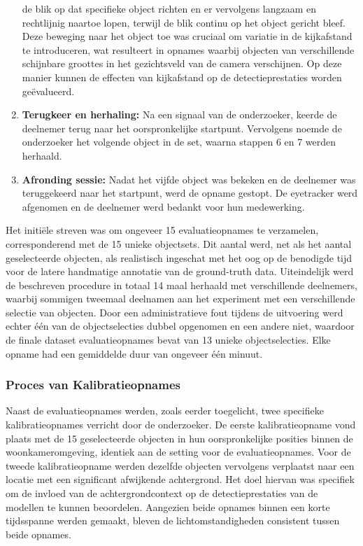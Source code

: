 \begin{enumerate}
  de blik op dat specifieke object richten en er vervolgens langzaam en rechtlijnig naartoe lopen, 
  terwijl de blik continu op het object gericht bleef. 
  Deze beweging naar het object toe was cruciaal om variatie in de kijkafstand te introduceren, 
  wat resulteert in opnames waarbij objecten van verschillende schijnbare groottes in het gezichtsveld van de camera verschijnen. 
  Op deze manier kunnen de effecten van kijkafstand op de detectieprestaties worden geëvalueerd.
  \item \textbf{Terugkeer en herhaling:} Na een signaal van de onderzoeker, keerde de deelnemer terug naar het oorspronkelijke startpunt. 
  Vervolgens noemde de onderzoeker het volgende object in de set, waarna stappen 6 en 7 werden herhaald.
  \item \textbf{Afronding sessie:} Nadat het vijfde object was bekeken en de deelnemer was teruggekeerd naar het startpunt, 
  werd de opname gestopt. De eyetracker werd afgenomen en de deelnemer werd bedankt voor hun medewerking.
\end{enumerate}

Het initiële streven was om ongeveer 15 evaluatieopnames te verzamelen, corresponderend met de 15 unieke objectsets. 
Dit aantal werd, net als het aantal geselecteerde objecten, als realistisch ingeschat met het oog op de benodigde tijd voor de 
latere handmatige annotatie van de ground-truth data. 
Uiteindelijk werd de beschreven procedure in totaal 14 maal herhaald met verschillende deelnemers, 
waarbij sommigen tweemaal deelnamen aan het experiment met een verschillende selectie van objecten. 
Door een administratieve fout tijdens de uitvoering werd echter één van de objectselecties dubbel opgenomen en een andere niet, 
waardoor de finale dataset evaluatieopnames bevat van 13 unieke objectselecties. 
Elke opname had een gemiddelde duur van ongeveer één minuut.

\subsubsection{Proces van Kalibratieopnames}

Naast de evaluatieopnames werden, zoals eerder toegelicht, twee specifieke kalibratieopnames verricht door de onderzoeker.
De eerste kalibratieopname vond plaats met de 15 geselecteerde objecten in hun oorspronkelijke posities binnen de woonkameromgeving, 
identiek aan de setting voor de evaluatieopnames. 
Voor de tweede kalibratieopname werden dezelfde objecten vervolgens verplaatst naar een locatie met een significant afwijkende achtergrond. 
Het doel hiervan was specifiek om de invloed van de achtergrondcontext op de detectieprestaties van de modellen te kunnen beoordelen.
Aangezien beide opnames binnen een korte tijdsspanne werden gemaakt, bleven de lichtomstandigheden consistent tussen beide opnames.

